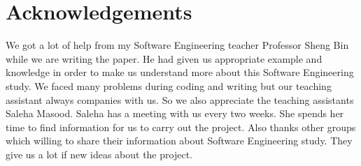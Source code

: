 \section{Acknowledgements}
We got a lot of help from my Software Engineering teacher Professor Sheng Bin while we are writing the paper. He had given us appropriate example and knowledge in order to make us understand more about this Software Engineering study. We faced many problems during coding and writing but our teaching assistant always companies with us. So we also appreciate the teaching assistants Saleha Masood. Saleha has a meeting with us every two weeks. She spends her time to find information for us to carry out the project. Also thanks other groups which willing to share their information about Software Engineering study. They give us a lot if new ideas about the project.